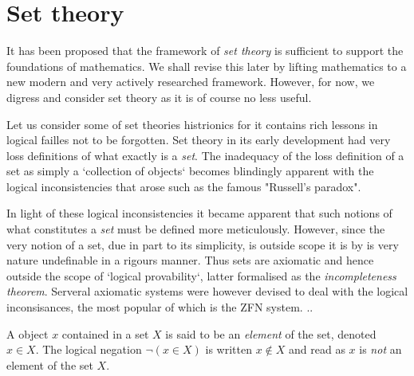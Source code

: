 %
%

\section{Set theory} %
\label{sec:settheory}

It has been proposed that the framework of \emph{set theory} is sufficient to
support the foundations of mathematics. We shall revise this later by lifting
mathematics to a new modern and very actively researched framework. However,
for now, we digress and consider set theory as it is of course no less useful.

Let us consider some of set theories histrionics for it contains rich lessons
in logical failles not to be forgotten. Set theory in its early development had
very loss definitions of what exactly is a \emph{set}. The inadequacy of the
loss definition of a set as simply a `collection of objects` becomes blindingly
apparent with the logical inconsistencies that arose such as the famous
"Russell's paradox".

In light of these logical inconsistencies it became apparent that such notions
of what constitutes a \emph{set} must be defined more meticulously. However,
since the very notion of a set, due in part to its simplicity, is outside scope
it is by is very nature undefinable in a rigours manner. Thus sets are
axiomatic and hence outside the scope of `logical provability`, latter
formalised as the \emph{incompleteness theorem}. Serveral axiomatic systems
were however devised to deal with the logical inconsisances, the most popular
of which is the ZFN system.
..

\begin{defn}
 A object $x$ contained in a set $X$ is said to be an \emph{element} of the
 set, denoted $x \in X$. The logical negation $\neg (x \in X)$ is written
 $x \not \in X$ and read as $x$ is \emph{not} an element of the set $X$.
\end{defn}

